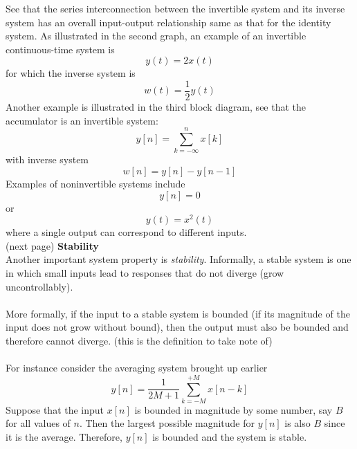 \documentclass{report}
\begin{document}
See that the series interconnection between the invertible system and its inverse system has an overall input-output relationship
same as that for the identity system.
As illustrated in the second graph, an example of an invertible
continuous-time system is 
\begin{equation*}
y(t)=2x(t)
\end{equation*}
for which the inverse system is
\begin{equation*}
w(t)=\frac{1}{2}y(t)
\end{equation*}
Another example is illustrated in the third block diagram, see that the accumulator is an invertible system:
\begin{equation*}
y[n]=\sum^n_{k=-\infty}x[k]
\end{equation*}
with inverse system
\begin{equation*}
w[n]=y[n]-y[n-1]
\end{equation*}
Examples of noninvertible systems include
\begin{equation*}
y[n]=0
\end{equation*}
or
\begin{equation*}
y(t)=x^2(t)
\end{equation*}
where a single output can correspond to different inputs.\\
(next page)\newpage
\noindent\textbf{Stability}\\
Another important system property is \textit{stability}. Informally, a stable system is one in which small inputs lead to
responses that do not diverge (grow uncontrollably).\\
\vspace{1mm}\\
More formally, if the input to a stable system is bounded (if its magnitude of the input does not grow without bound), then the
output must also be bounded and therefore cannot diverge. (this is the definition to take note of)\\
\vspace{1mm}\\
For instance consider the averaging system brought up earlier
\begin{equation*}
y[n]=\frac{1}{2M+1}\sum^{+M}_{k=-M}x[n-k]
\end{equation*}
Suppose that the input $x[n]$ is bounded in magnitude by some number, say $B$ for all values of $n$. Then the largest possible 
magnitude for $y[n]$ is also $B$ since it is the average. Therefore, $y[n]$ is bounded and the system is stable.\\
\end{document}
